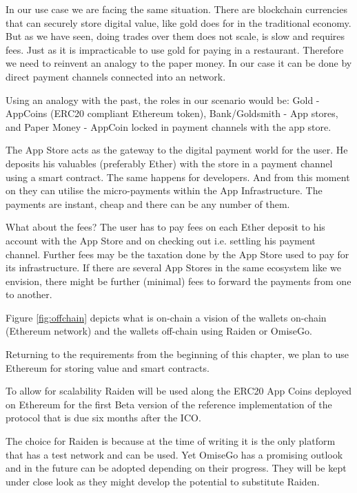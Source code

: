 In our use case we are facing the same situation. There are blockchain currencies that can securely store digital value, like gold does for in the traditional economy. But as we have seen, doing trades over them does not scale, is slow and requires fees. Just as it is impracticable to use gold for paying in a restaurant. Therefore we need to reinvent an analogy to the paper money. In our case it can be done by direct payment channels connected into an network.

Using an analogy with the past, the roles in our scenario would be:  Gold - AppCoins (ERC20 compliant Ethereum token),  Bank/Goldsmith - App stores, and Paper Money - AppCoin locked in payment channels with the app store.

The App Store acts as the gateway to the digital payment world for the user. He deposits his valuables (preferably Ether) with the store in a payment channel using a smart contract. The same happens for developers. And from this moment on they can utilise the micro-payments within the App Infrastructure. The payments are instant, cheap and there can be any number of them.

What about the fees? The user has to pay fees on each Ether deposit to his account with the App Store and on checking out i.e. settling his payment channel. Further fees may be the taxation done by the App Store used to pay for its infrastructure.  If there are several App Stores in the same ecosystem like we envision, there might be further (minimal) fees to forward the payments from one to another.

Figure \ref{fig:offchain} depicts what is on-chain a vision of the wallets on-chain (Ethereum network) and the wallets off-chain using Raiden or OmiseGo.


Returning to the requirements from the beginning of this chapter, we plan to use Ethereum for storing value and smart contracts. 

To allow for scalability Raiden will be used along the ERC20 App Coins deployed on Ethereum for the first Beta version of the reference implementation of the protocol that is due six months after the ICO. %

The choice for Raiden is because at the time of writing it is the only platform that has a test network and can be used. Yet OmiseGo has a promising outlook and in the future can be adopted depending on their progress. They will be kept under close look as they might develop the potential to substitute Raiden.


